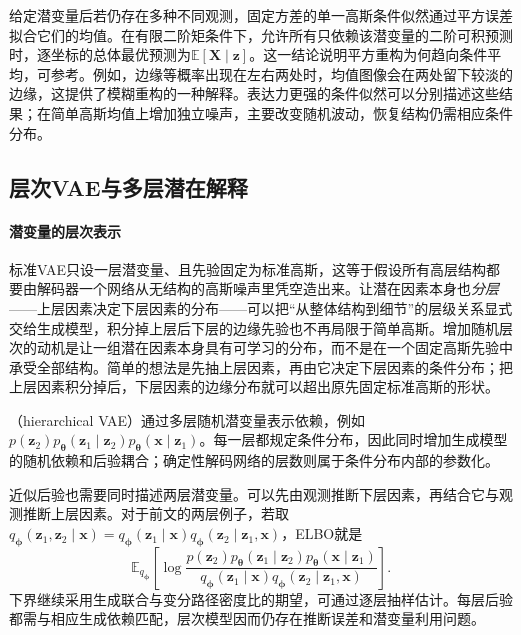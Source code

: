 给定潜变量后若仍存在多种不同观测，固定方差的单一高斯条件似然通过平方误差拟合它们的均值。在有限二阶矩条件下，允许所有只依赖该潜变量的二阶可积预测时，逐坐标的总体最优预测为$\mathbb E[\bm X\mid\bm z]$。这一结论说明平方重构为何趋向条件平均，可参考。例如，边缘等概率出现在左右两处时，均值图像会在两处留下较淡的边缘，这提供了模糊重构的一种解释。表达力更强的条件似然可以分别描述这些结果；在简单高斯均值上增加独立噪声，主要改变随机波动，恢复结构仍需相应条件分布。

\subsection{层次VAE与多层潜在解释}
\label{sec:pgm-generative-hierarchical-vae}

\paragraph{潜变量的层次表示}

标准VAE只设一层潜变量、且先验固定为标准高斯，这等于假设所有高层结构都要由解码器一个网络从无结构的高斯噪声里凭空造出来。让潜在因素本身也\emph{分层}——上层因素决定下层因素的分布——可以把“从整体结构到细节”的层级关系显式交给生成模型，积分掉上层后下层的边缘先验也不再局限于简单高斯。增加随机层次的动机是让一组潜在因素本身具有可学习的分布，而不是在一个固定高斯先验中承受全部结构。简单的想法是先抽上层因素，再由它决定下层因素的条件分布；把上层因素积分掉后，下层因素的边缘分布就可以超出原先固定标准高斯的形状。

（hierarchical VAE）通过多层随机潜变量表示依赖，例如$p(\bm{z}_2)p_{\bm{\theta}}(\bm{z}_1\mid\bm{z}_2)p_{\bm{\theta}}(\bm{x}\mid\bm{z}_1)$。每一层都规定条件分布，因此同时增加生成模型的随机依赖和后验耦合；确定性解码网络的层数则属于条件分布内部的参数化。

近似后验也需要同时描述两层潜变量。可以先由观测推断下层因素，再结合它与观测推断上层因素。对于前文的两层例子，若取$q_{\bm{\phi}}(\bm{z}_1,\bm{z}_2\mid\bm{x})=q_{\bm{\phi}}(\bm{z}_1\mid\bm{x})q_{\bm{\phi}}(\bm{z}_2\mid\bm{z}_1,\bm{x})$，ELBO就是
\[
  \mathbb{E}_{q_{\bm{\phi}}}
  \left[
    \log\frac{
      p(\bm{z}_2)p_{\bm{\theta}}(\bm{z}_1\mid\bm{z}_2)
          p_{\bm{\theta}}(\bm{x}\mid\bm{z}_1)}
      {q_{\bm{\phi}}(\bm{z}_1\mid\bm{x})
          q_{\bm{\phi}}(\bm{z}_2\mid\bm{z}_1,\bm{x})}
  \right].
\]
下界继续采用生成联合与变分路径密度比的期望，可通过逐层抽样估计。每层后验都需与相应生成依赖匹配，层次模型因而仍存在推断误差和潜变量利用问题。


